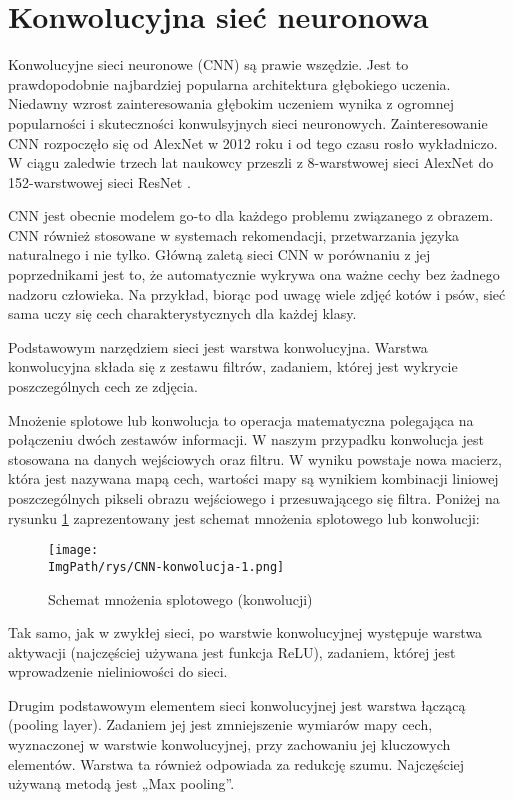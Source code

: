 \documentclass[a4paper,12pt,twoside,openany]{report}
\newcommand{\ImgPath}{.}
\begin{document}
\section{Konwolucyjna sieć neuronowa}
	Konwolucyjne sieci neuronowe (CNN) są prawie wszędzie. Jest to prawdopodobnie najbardziej popularna architektura głębokiego uczenia. Niedawny wzrost zainteresowania głębokim uczeniem wynika z ogromnej popularności i skuteczności konwulsyjnych sieci neuronowych. Zainteresowanie CNN rozpoczęło się od AlexNet \cite{NIPS2012_c399862d} w 2012 roku i od tego czasu rosło wykładniczo. W ciągu zaledwie trzech lat naukowcy przeszli z 8-warstwowej sieci AlexNet \cite{NIPS2012_c399862d} do 152-warstwowej sieci ResNet \cite{ResNet}.

	CNN jest obecnie modelem go-to dla każdego problemu związanego z obrazem. CNN również stosowane w systemach rekomendacji, przetwarzania języka naturalnego i nie tylko. Główną zaletą sieci CNN w porównaniu z jej poprzednikami jest to, że automatycznie wykrywa ona ważne cechy bez żadnego nadzoru człowieka. Na przykład, biorąc pod uwagę wiele zdjęć kotów i psów, sieć sama uczy się cech charakterystycznych dla każdej klasy.

	Podstawowym narzędziem sieci jest warstwa konwolucyjna. Warstwa konwolucyjna składa się z zestawu filtrów, zadaniem, której jest wykrycie poszczególnych cech ze zdjęcia.

	Mnożenie splotowe lub konwolucja to operacja matematyczna polegająca na połączeniu dwóch zestawów informacji. W naszym przypadku konwolucja jest stosowana na danych wejściowych oraz filtru. W wyniku powstaje nowa macierz, która jest nazywana mapą cech, wartości mapy są wynikiem kombinacji liniowej poszczególnych pikseli obrazu wejściowego i przesuwającego się filtra. Poniżej na rysunku \ref{schematKonwolucji} zaprezentowany jest schemat mnożenia splotowego lub konwolucji:
	\begin{figure}[!htbp]
		\begin{center}
			\centering
			\texttt{[image: \\ImgPath/rys/CNN-konwolucja-1.png]}
		\end{center}
		\caption{Schemat mnożenia splotowego (konwolucji)}
		\label{schematKonwolucji}
	\end{figure}

	Tak samo, jak w zwykłej sieci, po warstwie konwolucyjnej występuje warstwa aktywacji (najczęściej używana jest funkcja ReLU), zadaniem, której jest wprowadzenie nieliniowości do sieci.
	
	Drugim podstawowym elementem sieci konwolucyjnej jest warstwa łączącą (pooling layer). Zadaniem jej jest zmniejszenie wymiarów mapy cech, wyznaczonej w warstwie konwolucyjnej, przy zachowaniu jej kluczowych elementów. Warstwa ta również odpowiada za redukcję szumu. Najczęściej używaną metodą jest „Max pooling”.
\end{document}
